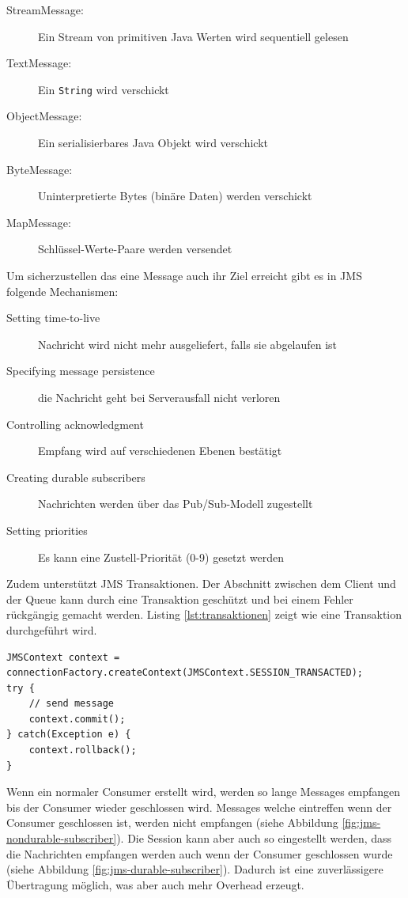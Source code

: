 \begin{description}
	\item[StreamMessage:] Ein Stream von primitiven Java Werten wird sequentiell gelesen
	\item[TextMessage:] Ein \verb|String| wird verschickt
	\item[ObjectMessage:] Ein serialisierbares Java Objekt wird verschickt
	\item[ByteMessage:] Uninterpretierte Bytes (binäre Daten) werden verschickt
	\item[MapMessage:] Schlüssel-Werte-Paare werden versendet
\end{description}

Um sicherzustellen das eine Message auch ihr Ziel erreicht gibt es in JMS folgende Mechanismen:

\begin{description}
	\item[Setting time-to-live] Nachricht wird nicht mehr ausgeliefert, falls sie abgelaufen ist
	\item[Specifying message persistence] die Nachricht geht bei Serverausfall nicht verloren
	\item[Controlling acknowledgment] Empfang wird auf verschiedenen Ebenen bestätigt
	\item[Creating durable subscribers] Nachrichten werden über das Pub/Sub-Modell zugestellt
	\item[Setting priorities] Es kann eine Zustell-Priorität (0-9) gesetzt werden
\end{description}

Zudem unterstützt JMS Transaktionen. Der Abschnitt zwischen dem Client und der Queue kann durch eine Transaktion geschützt und bei einem Fehler rückgängig gemacht werden. Listing \ref{lst:transaktionen} zeigt wie eine Transaktion durchgeführt wird.

\begin{lstlisting}[caption=JMS Transaktionen, label=lst:transaktionen]
JMSContext context = connectionFactory.createContext(JMSContext.SESSION_TRANSACTED);
try {
	// send message
	context.commit();
} catch(Exception e) {
	context.rollback();
}
\end{lstlisting}

Wenn ein normaler Consumer erstellt wird, werden so lange Messages empfangen bis der Consumer wieder geschlossen wird. Messages welche eintreffen wenn der Consumer geschlossen ist, werden nicht empfangen (siehe Abbildung \ref{fig:jms-nondurable-subscriber}). Die Session kann aber auch so eingestellt werden, dass die Nachrichten empfangen werden auch wenn der Consumer geschlossen wurde (siehe Abbildung \ref{fig:jms-durable-subscriber}). Dadurch ist eine zuverlässigere Übertragung möglich, was aber auch mehr Overhead erzeugt.

